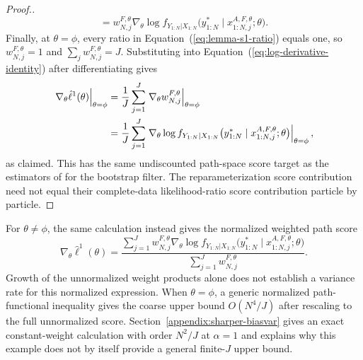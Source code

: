 \documentclass[11pt]{article}
\theoremstyle{thmstylethree}%
\begin{document}
\begin{proof}[Proof.]
\begin{equation}
=w_{N,j}^{F,\theta}\nabla_\theta\log f_{Y_{1:N}|X_{1:N}}
 \big(y_{1:N}^*\mid x_{1:N,j}^{A,F,\theta};\theta\big).
\label{eq:lemma-s1-filtered-score}
\end{equation}
Finally, at $\theta=\phi$, every ratio in
Equation~(\ref{eq:lemma-s1-ratio}) equals one, so
$w_{N,j}^{F,\theta}=1$ and $\sum_jw_{N,j}^{F,\theta}=J$.
Substituting into Equation~(\ref{eq:log-derivative-identity}) after
differentiating gives
\begin{align}
\left.\nabla_\theta\hat\ell^1(\theta)\right|_{\theta=\phi}
&=\frac1J\sum_{j=1}^{J}
 \left.\nabla_\theta w_{N,j}^{F,\theta}\right|_{\theta=\phi}
 \notag\\*
&=\frac1J\sum_{j=1}^{J}
 \left.\nabla_\theta\log f_{Y_{1:N}|X_{1:N}}
 \big(y_{1:N}^*\mid x_{1:N,j}^{A,F,\theta};\theta\big)
 \right|_{\theta=\phi},
\end{align}
as claimed.
This has the same undiscounted path-space score target as the estimators of
\cite{poyiadjis11, scibior21} for the bootstrap filter. The
reparameterization score contribution need not equal their complete-data
likelihood-ratio score contribution particle by particle.
\end{proof}

For $\theta\neq\phi$, the same calculation instead gives the normalized
weighted path score
\begin{equation}
\nabla_\theta\hat\ell^1(\theta)
=\frac{\displaystyle\sum_{j=1}^J w_{N,j}^{F,\theta}
\nabla_\theta\log f_{Y_{1:N}|X_{1:N}}
\big(y_{1:N}^*\mid x_{1:N,j}^{A,F,\theta};\theta\big)}
{\displaystyle\sum_{j=1}^J w_{N,j}^{F,\theta}}.
\end{equation}
Growth of the unnormalized weight products alone does not establish a
variance rate for this normalized expression.
When $\theta=\phi$, a generic normalized path-functional inequality gives
the coarse upper bound $O(N^4/J)$ after rescaling to the full
unnormalized score.  Section~\ref{appendix:sharper-biasvar} gives an exact
constant-weight calculation with order $N^2/J$ at $\alpha=1$ and explains
why this example does not by itself provide a general finite-$J$ upper
bound.
\end{document}
